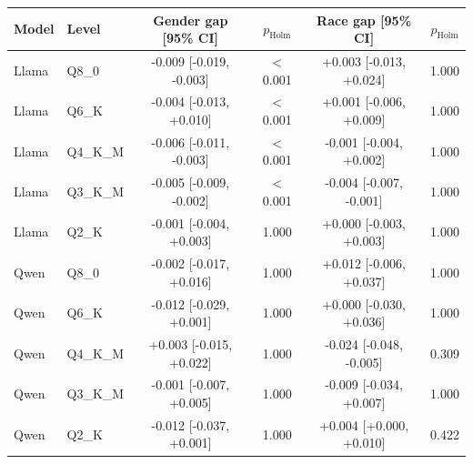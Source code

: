 \begin{tabular}{llcccc}
\toprule
Model & Level & Gender gap [95\% CI] & $p_{\mathrm{Holm}}$ & Race gap [95\% CI] & $p_{\mathrm{Holm}}$ \\
\midrule
Llama & Q8\_0 & -0.009 [-0.019, -0.003] & $<$0.001 & +0.003 [-0.013, +0.024] & 1.000 \\
Llama & Q6\_K & -0.004 [-0.013, +0.010] & $<$0.001 & +0.001 [-0.006, +0.009] & 1.000 \\
Llama & Q4\_K\_M & -0.006 [-0.011, -0.003] & $<$0.001 & -0.001 [-0.004, +0.002] & 1.000 \\
Llama & Q3\_K\_M & -0.005 [-0.009, -0.002] & $<$0.001 & -0.004 [-0.007, -0.001] & 1.000 \\
Llama & Q2\_K & -0.001 [-0.004, +0.003] & 1.000 & +0.000 [-0.003, +0.003] & 1.000 \\
Qwen & Q8\_0 & -0.002 [-0.017, +0.016] & 1.000 & +0.012 [-0.006, +0.037] & 1.000 \\
Qwen & Q6\_K & -0.012 [-0.029, +0.001] & 1.000 & +0.000 [-0.030, +0.036] & 1.000 \\
Qwen & Q4\_K\_M & +0.003 [-0.015, +0.022] & 1.000 & -0.024 [-0.048, -0.005] & 0.309 \\
Qwen & Q3\_K\_M & -0.001 [-0.007, +0.005] & 1.000 & -0.009 [-0.034, +0.007] & 1.000 \\
Qwen & Q2\_K & -0.012 [-0.037, +0.001] & 1.000 & +0.004 [+0.000, +0.010] & 0.422 \\
\bottomrule
\end{tabular}
